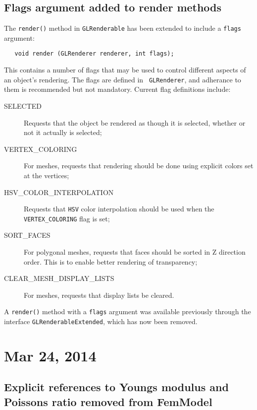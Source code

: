 \documentclass{article}
\begin{document}
\subsection*{Flags argument added to render methods}

The {\tt render()} method in {\tt GLRenderable} 
has been extended to include a {\tt flags}
argument:
\begin{lstlisting}
   void render (GLRenderer renderer, int flags);
\end{lstlisting}
This contains a number of flags that may be used to control different
aspects of an object's rendering.  The flags are defined in {\tt
GLRenderer}, and adherance to them is recommended but not
mandatory. Current flag definitions include:

\begin{description}

\item[SELECTED] Requests that the object be rendered as though it
is selected, whether or not it actually is selected;

\item[VERTEX\_COLORING] For meshes, requests that rendering should
be done using explicit colors set at the vertices;

\item[HSV\_COLOR\_INTERPOLATION] Requests that {\tt HSV} color
interpolation should be used when the {\tt VERTEX\_COLORING}
flag is set;

\item[SORT\_FACES] For polygonal meshes, requests that faces should
be sorted in Z direction order. This is to enable better rendering of
transparency;

\item[CLEAR\_MESH\_DISPLAY\_LISTS] For meshes, requests that display
lists be cleared.

\end{description}

A {\tt render()} method with a {\tt flags} argument was available
previously through the interface {\tt GLRenderableExtended}, which has
now been removed.

\section*{Mar 24, 2014}

\subsection*{Explicit references to Youngs modulus and Poissons ratio 
removed from FemModel}
\end{document}
